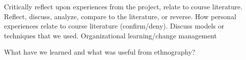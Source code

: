 Critically reflect upon experiences from the project, relate to course literature.
Reflect, discuss, analyze, compare to the literature, or reverse.
How personal experiences relate to course literature (confirm/deny).
Discuss models or techniques that we used.
Organizational learning/change management


What have we learned and what was useful from ethnography?